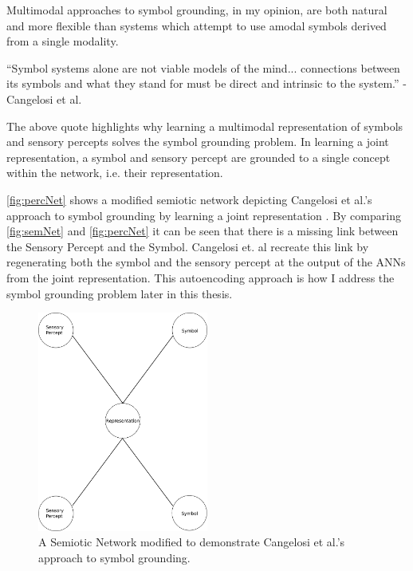 Multimodal approaches to symbol grounding, in my opinion, are both natural and more flexible than systems which attempt to use amodal symbols derived from a single modality.

\begin{displayquote}
``Symbol systems alone are not viable models of the mind... connections between its symbols and what they stand for must be direct and intrinsic to the system.'' - Cangelosi et al.
\end{displayquote}

The above quote highlights why learning a multimodal representation of symbols and sensory percepts solves the symbol grounding problem. In learning a joint representation, a symbol and sensory percept are grounded to a single concept within the network, i.e. their representation.

\autoref{fig:percNet} shows a modified semiotic network depicting Cangelosi et al.'s approach to symbol grounding by learning a joint representation \cite{cangelosi2000robotic}. By comparing \autoref{fig:semNet} and \autoref{fig:percNet} it can be seen that there is a missing link between the Sensory Percept and the Symbol. Cangelosi et. al recreate this link by regenerating both the symbol and the sensory percept at the output of the \acp{ANN} from the joint representation. This autoencoding approach is how I address the symbol grounding problem later in this thesis.

\begin{figure}
\centering
\includegraphics[width=0.5\textwidth]{Figs/litReview/semioticNetPercept.png}
\caption{A Semiotic Network modified to demonstrate Cangelosi et al.'s approach to symbol grounding.}
\label{fig:percNet}

\end{figure}


